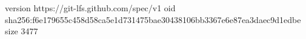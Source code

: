 version https://git-lfs.github.com/spec/v1
oid sha256:f6e179655c458d58ca5e1d731475bae30438106bb3367e6e87ea3daec9d1edbe
size 3477
